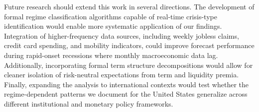 Future research should extend this work in several directions. The development of formal regime classification algorithms capable of real-time crisis-type identification would enable more systematic application of our findings. Integration of higher-frequency data sources, including weekly jobless claims, credit card spending, and mobility indicators, could improve forecast performance during rapid-onset recessions where monthly macroeconomic data lag. Additionally, incorporating formal term structure decompositions would allow for cleaner isolation of risk-neutral expectations from term and liquidity premia. Finally, expanding the analysis to international contexts would test whether the regime-dependent patterns we document for the United States generalize across different institutional and monetary policy frameworks.